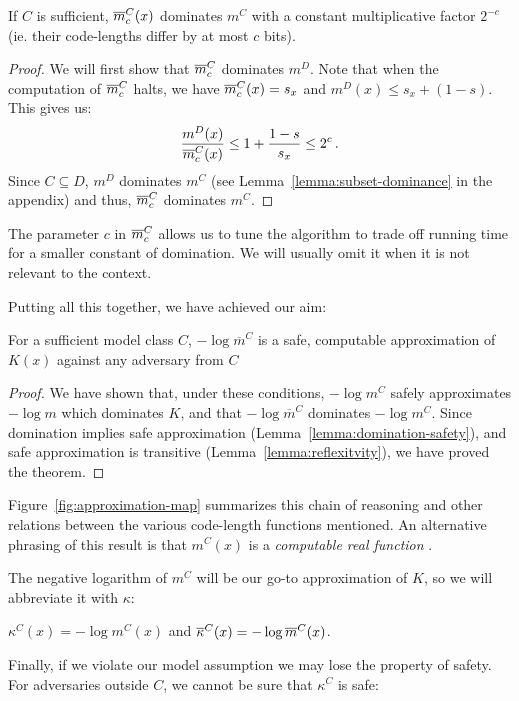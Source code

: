 \begin{lemma}
If $C$ is sufficient, ${\overline{m}}^C_c(x)$ dominates $m^C$ with a constant multiplicative factor $2^{-c}$ (ie. their code-lengths differ by at most $c$ bits).
\label{lemma:overline-dominance}
\end{lemma}
\begin{proof}\belowdisplayskip=-12pt
We will first show that ${\overline{m}}^C_c$ dominates $m^D$. Note that when the computation of ${\overline{m}}^C_c$ halts, we have ${\overline{m}}^C_c(x) = s_x$ and $m^D(x) \leq s_x + (1 - s)$. This gives us:
\[
\frac{m^D(x)}{{\overline{m}}^C_c(x)} \leq 1 + \frac{1 - s}{s_x} \leq 2^{c} \,\text{.}
\]
Since $C \subseteq D$, $m^D$ dominates $m^C$ (see Lemma~\ref{lemma:subset-dominance} in the appendix) and thus, ${\overline{m}}^C_c$ dominates $m^C$.
\end{proof}
The parameter $c$ in ${\overline{m}}^C_c$ allows us to tune the algorithm to trade off running time for a smaller constant of domination. We will usually omit it when it is not relevant to the context. 

Putting all this together, we have achieved our aim: 
\begin{theorem}
For a sufficient model class $C$, $-\log \overline{m}^C$ is a safe, computable approximation of $K(x)$ against any adversary from $C$
\label{theorem:safe-computable}
\end{theorem}
\begin{proof}
We have shown that, under these conditions, $-\log m^C$ safely approximates $-\log m$ which dominates $K$, and that $-\log \overline{m}^C$ dominates $-\log m^C$. Since domination implies safe approximation (Lemma~\ref{lemma:domination-safety}), and safe approximation is transitive (Lemma~\ref{lemma:reflexitvity}), we have proved the theorem.  
\end{proof}
Figure~\ref{fig:approximation-map} summarizes this chain of reasoning and other relations between the various code-length functions mentioned. An alternative phrasing of this result is that $m^C(x)$ is a \emph{computable real function} \cite[Definition~4.1.2]{li1993introduction}.

The negative logarithm of $m^C$ will be our go-to approximation of $K$, so we will abbreviate it with $\kappa$:
\begin{definition}
$\kappa^C(x) = -\log m^C(x)$ and ${\overline{\kappa}}^C(x) = -\log {\overline{m}}^C(x)$.
\end{definition}  
Finally, if we violate our model assumption we may lose the property of safety. For adversaries outside $C$, we cannot be sure that $\kappa^C$ is safe:

